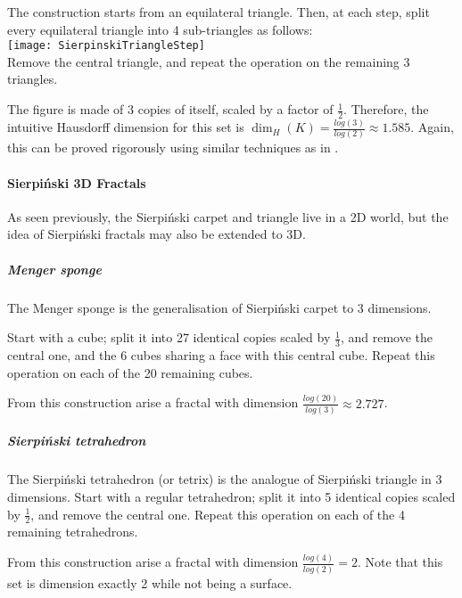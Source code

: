 The construction starts from an equilateral triangle.
Then, at each step, split every equilateral triangle into 4 sub-triangles as follows:\\
\texttt{[image: SierpinskiTriangleStep]}\\
Remove the central triangle, and repeat the operation on the remaining 3 triangles.

The figure is made of $3$ copies of itself, scaled by a factor of $\frac{1}{2}$.
Therefore, the intuitive Hausdorff dimension for this set is $\dim_H(K) = \frac{log(3)}{log(2)} \approx 1.585$.
Again, this can be proved rigorously using similar techniques as in \cite[p. 34-35, ex. 2.7]{Falconer_1990}.

\paragraph{Sierpiński 3D Fractals}
As seen previously, the Sierpiński carpet and triangle live in a 2D world, but the idea of Sierpiński fractals may also be extended to 3D.

\subparagraph{Menger sponge}
The Menger sponge is the generalisation of Sierpiński carpet to 3 dimensions.

Start with a cube; split it into 27 identical copies scaled by $\frac{1}{3}$, and remove the central one, and the 6 cubes sharing a face with this central cube.
Repeat this operation on each of the 20 remaining cubes.

From this construction arise a fractal with dimension $\frac{log(20)}{log(3)} \approx 2.727$.

\subparagraph{Sierpiński tetrahedron}
The Sierpiński tetrahedron (or tetrix) is the analogue of Sierpiński triangle in 3 dimensions.
Start with a regular tetrahedron; split it into 5 identical copies scaled by $\frac{1}{2}$, and remove the central one.
Repeat this operation on each of the 4 remaining tetrahedrons.

From this construction arise a fractal with dimension $\frac{log(4)}{log(2)} = 2$.
Note that this set is dimension exactly 2 while not being a surface.

